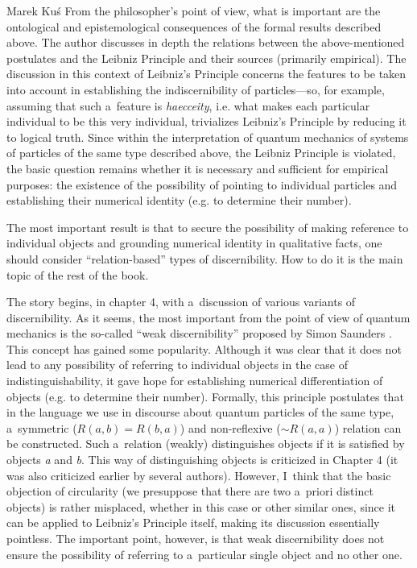 \begin{newrevengenv}{Marek Kuś}
From the philosopher's point of view, what is important are the ontological and epistemological consequences of the formal results described above. The author discusses in depth the relations between the above-mentioned postulates and the Leibniz Principle and their sources (primarily empirical). The discussion in this context of Leibniz's Principle concerns the features to be taken into account in establishing the indiscernibility of particles—so, for example, assuming that such a~feature is \textit{haecceity}, i.e. what makes each particular individual to be this very individual, trivializes Leibniz's Principle by reducing it to logical truth. Since within the interpretation of quantum mechanics of systems of particles of the same type described above, the Leibniz Principle is violated, the basic question remains whether it is necessary and sufficient for empirical purposes: the existence of the possibility of pointing to individual particles and establishing their numerical identity (e.g. to determine their number).

The most important result is that to secure the possibility of making reference to individual objects and grounding numerical identity in qualitative facts, one should consider ``relation-based'' types of discernibility. How to do it is the main topic of the rest of the book.

The story begins, in chapter 4, with a~discussion of various variants of discernibility. As it seems, the most important from the point of view of quantum mechanics is the so-called ``weak discernibility'' proposed by Simon Saunders
\parencite*[][]{brading_physics_2003}. %
 This concept has gained some popularity. Although it was clear that it does not lead to any possibility of referring to individual objects in the case of indistinguishability, it gave hope for establishing numerical differentiation of objects (e.g. to determine their number). Formally, this principle postulates that in the language we use in discourse about quantum particles of the same type, a~symmetric ($R(a,b) = R(b,a)$) and non-reflexive (${\sim}R(a,a)$) relation can be constructed. Such a~relation (weakly) distinguishes objects if it is satisfied by objects \textit{a} and \textit{b}. This way of distinguishing objects is criticized in Chapter 4 (it was also criticized earlier by several authors). However, I~think that the basic objection of circularity (we presuppose that there are two a~priori distinct objects) is rather misplaced, whether in this case or other similar ones, since it can be applied to Leibniz's Principle itself, making its discussion essentially pointless. The important point, however, is that weak discernibility does not ensure the possibility of referring to a~particular single object and no other one.


\end{newrevengenv}
